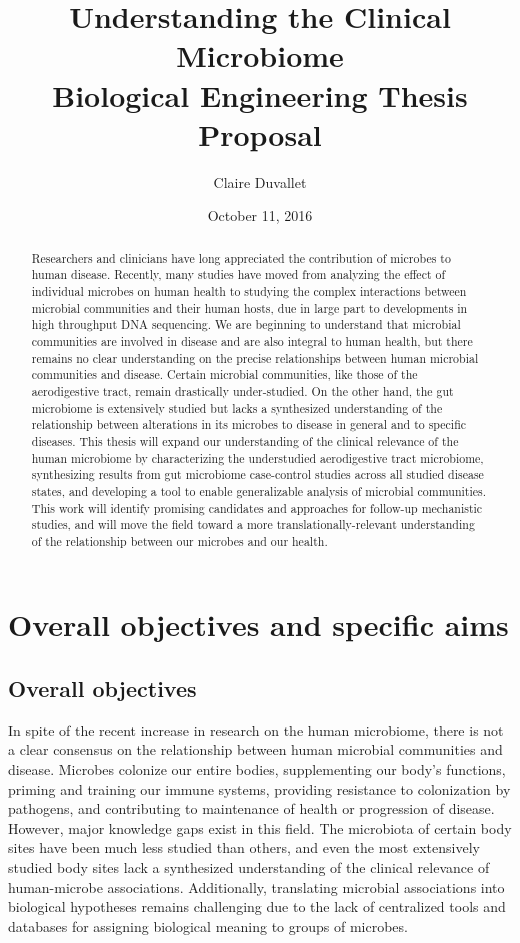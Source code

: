 \documentclass[12pt]{article}
\title{Understanding the Clinical Microbiome \\ Biological Engineering Thesis Proposal}
\author{Claire Duvallet}
\date{October 11, 2016}
\begin{document}
\maketitle
\newpage
\tableofcontents

\begin{abstract}
Researchers and clinicians have long appreciated the contribution of microbes
to human disease. Recently, many studies have moved from analyzing the effect of
individual microbes on human health to studying the complex interactions between
microbial communities and their human hosts, due in large part to developments
in high throughput DNA sequencing. We are beginning to understand
that microbial communities are involved in disease and are also
integral to human health,
but there remains no clear understanding on the precise relationships between human 
microbial communities and disease. Certain microbial communities, like those
of the aerodigestive tract, remain drastically under-studied. On the other hand,
the gut microbiome is extensively studied but lacks
a synthesized understanding of the relationship between alterations in its
microbes to disease in general and to specific diseases.
This thesis will expand our understanding of the clinical relevance
of the human microbiome by characterizing the 
understudied aerodigestive tract microbiome,
synthesizing results from gut microbiome case-control studies across
all studied disease states, and developing a tool to enable generalizable analysis
of microbial communities. This work will identify promising candidates and approaches
for follow-up mechanistic studies, and will move the field toward a more
translationally-relevant understanding of the relationship between our microbes
and our health.



\end{abstract}
\newpage

\section{Overall objectives and specific aims}
\subsection{Overall objectives}
In spite of the recent increase in research on the human 
microbiome, there is not a clear consensus on the relationship between 
human microbial communities and disease. Microbes colonize our entire bodies,
supplementing our body's functions, priming and training our immune 
systems, providing resistance to colonization 
by pathogens, and contributing to maintenance of health or progression of disease. 
However, major knowledge gaps exist in this field. 
The microbiota of certain body sites have been much less studied than others, and 
even the most extensively studied body sites lack a 
synthesized understanding of the clinical relevance of human-microbe associations. 
Additionally, translating microbial associations into biological hypotheses
remains challenging due to the lack of centralized tools and databases
for assigning biological meaning to groups of microbes.
\end{document}
